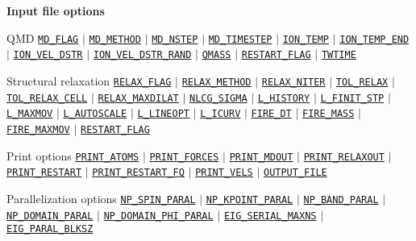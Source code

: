 \begin{frame}[allowframebreaks]{\textbf{Input file options}}
\begin{block}{QMD}
\hyperlink{MD_FLAG}{\texttt{MD\_FLAG}} $\vert$ \hyperlink{MD_METHOD}{\texttt{MD\_METHOD}} $\vert$ \hyperlink{MD_NSTEP}{\texttt{MD\_NSTEP}} $\vert$ \hyperlink{MD_TIMESTEP}{\texttt{MD\_TIMESTEP}} $\vert$ \hyperlink{ION_TEMP}{\texttt{ION\_TEMP}} $\vert$ \hyperlink{ION_TEMP_END}{\texttt{ION\_TEMP\_END}} $\vert$ \hyperlink{ION_VEL_DSTR}{\texttt{ION\_VEL\_DSTR}} $\vert$ \hyperlink{ION_VEL_DSTR_RAND}{\texttt{ION\_VEL\_DSTR\_RAND}} $\vert$ \hyperlink{QMASS}{\texttt{QMASS}} $\vert$
\hyperlink{RESTART_FLAG}{\texttt{RESTART\_FLAG}} $\vert$ \hyperlink{TWTIME}{\texttt{TWTIME}}
\end{block}
\vspace{-2mm}
\begin{block}{Structural relaxation}
\hyperlink{RELAX_FLAG}{\texttt{RELAX\_FLAG}} $\vert$ \hyperlink{RELAX_METHOD}{\texttt{RELAX\_METHOD}} $\vert$ \hyperlink{RELAX_NITER}{\texttt{RELAX\_NITER}} $\vert$ \hyperlink{TOL_RELAX}{\texttt{TOL\_RELAX}} $\vert$ \hyperlink{TOL_RELAX_CELL}{\texttt{TOL\_RELAX\_CELL}} $\vert$ \hyperlink{RELAX_MAXDILAT}{\texttt{RELAX\_MAXDILAT}} $\vert$ \hyperlink{NLCG_SIGMA}{\texttt{NLCG\_SIGMA}} $\vert$ \hyperlink{L_HISTORY}{\texttt{L\_HISTORY}} $\vert$ \hyperlink{L_FINIT_STP}{\texttt{L\_FINIT\_STP}} $\vert$ \hyperlink{L_MAXMOV}{\texttt{L\_MAXMOV}} $\vert$ \hyperlink{L_AUTOSCALE}{\texttt{L\_AUTOSCALE}} $\vert$ \hyperlink{L_LINEOPT}{\texttt{L\_LINEOPT}} $\vert$ \hyperlink{L_ICURV}{\texttt{L\_ICURV}} $\vert$ \hyperlink{FIRE_DT}{\texttt{FIRE\_DT}} $\vert$ \hyperlink{FIRE_MASS}{\texttt{FIRE\_MASS}} $\vert$ \hyperlink{FIRE_MAXMOV}{\texttt{FIRE\_MAXMOV}} $\vert$ \hyperlink{RESTART_FLAG}{\texttt{RESTART\_FLAG}}
\end{block}

\begin{block}{Print options}
\hyperlink{PRINT_ATOMS}{\texttt{PRINT\_ATOMS}} $\vert$ \hyperlink{PRINT_FORCES}{\texttt{PRINT\_FORCES}} $\vert$ \hyperlink{PRINT_MDOUT}{\texttt{PRINT\_MDOUT}} $\vert$ \hyperlink{PRINT_RELAXOUT}{\texttt{PRINT\_RELAXOUT}} $\vert$ \hyperlink{PRINT_RESTART}{\texttt{PRINT\_RESTART}} $\vert$ \hyperlink{PRINT_RESTART_FQ}{\texttt{PRINT\_RESTART\_FQ}} $\vert$ \hyperlink{PRINT_VELS}{\texttt{PRINT\_VELS}} $\vert$ \hyperlink{OUTPUT_FILE}{\texttt{OUTPUT\_FILE}}
\end{block}

\begin{block}{Parallelization options}
\hyperlink{NP_SPIN_PARAL}{\texttt{NP\_SPIN\_PARAL}} $\vert$ \hyperlink{NP_KPOINT_PARAL}{\texttt{NP\_KPOINT\_PARAL}} $\vert$ \hyperlink{NP_BAND_PARAL}{\texttt{NP\_BAND\_PARAL}} $\vert$ \hyperlink{NP_DOMAIN_PARAL}{\texttt{NP\_DOMAIN\_PARAL}} $\vert$ \hyperlink{NP_DOMAIN_PHI_PARAL}{\texttt{NP\_DOMAIN\_PHI\_PARAL}} $\vert$ \hyperlink{EIG_SERIAL_MAXNS}{\texttt{EIG\_SERIAL\_MAXNS}} $\vert$ \hyperlink{EIG_PARAL_BLKSZ}{\texttt{EIG\_PARAL\_BLKSZ}}
\end{block}

\end{frame}

